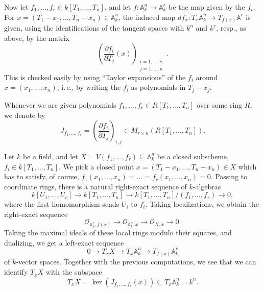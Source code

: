 \documentclass[a4paper, 12pt]{amsart}
\theoremstyle{remark}
\begin{document}
Now let $f_1, \ldots, f_r \in k[T_1, \ldots, T_n]$, and let $f \colon \mathbb{A}_k^n \to \mathbb{A}_k^r$ be the map given by the $f_i$. For $x = (T_1 - x_1, \ldots, T_n - x_n) \in \mathbb{A}^n_k$, the induced map $df_x: T_x\mathbb{A}_k^n \to T_{f(x)}\mathbb{A}^r$ is given, using the identifications of the tangent spaces with $k^n$ and $k^r$, resp., as above, by the matrix
\begin{equation*}
  \left( \frac{\partial f_i}{\partial T_j}(x) \right)_{\substack{i=1,\ldots,r, \\ j=1,\ldots,n}}.
\end{equation*}
This is checked easily by using ``Taylor expansions'' of the $f_i$ around $x = (x_1, \ldots, x_n)$, i.\,e., by writing the $f_i$ as polynomials in $T_j - x_j$.

Whenever we are given polynomials $f_1, \dots, f_r \in R[T_1, \dots, T_n]$ over some ring $R$, we denote by
\begin{equation*}
  J_{f_1, \dots, f_r} = \left(\frac{\partial f_i}{\partial T_j}\right)_{i, j} \in M_{r\times n}(R[T_1, \dots, T_n]).
\end{equation*}

Let $k$ be a field, and let $X = V(f_1, \dots, f_r) \subseteq \mathbb{A}^n_k$ be a closed subscheme, $f_i \in k[T_1, \dots, T_n]$.
We pick a closed point $x = (T_1 - x_1, \dots, T_n - x_n) \in X$ which has to satisfy, of course, $f_1(x_1, \dots, x_n) = \dots = f_r(x_1, \dots, x_n) = 0$.
Passing to coordinate rings, there is a natural right-exact sequence of $k$-algebras
\begin{equation*}
  k[U_1, \dots, U_r] \to k[T_1, \dots, T_n] \to k[T_1, \dots, T_n]/(f_1, \dots, f_r) \to 0,
\end{equation*}
where the first homomorphism sends $U_i$ to $f_i$.
Taking localizations, we obtain the right-exact sequence
\begin{equation*}
  \mathcal{O}_{\mathbb{A}^r_k, f(x)} \to \mathcal{O}_{\mathbb{A}^n_k, x} \to \mathcal{O}_{X, x} \to 0.
\end{equation*}
Taking the maximal ideals of these local rings modulo their squares, and dualizing, we get a left-exact sequence
\begin{equation*}
  0 \to T_xX \to T_x\mathbb{A}^n_k \to T_{f(x)}\mathbb{A}^r_k
\end{equation*}
of $k$-vector spaces.
Together with the previous computations, we see that we can identify $T_xX$ with the subspace
\begin{equation*}
  T_xX = \ker(J_{f_1, \dots, f_r}(x)) \subseteq T_x\mathbb{A}^n_k = k^n.
\end{equation*}
\end{document}
